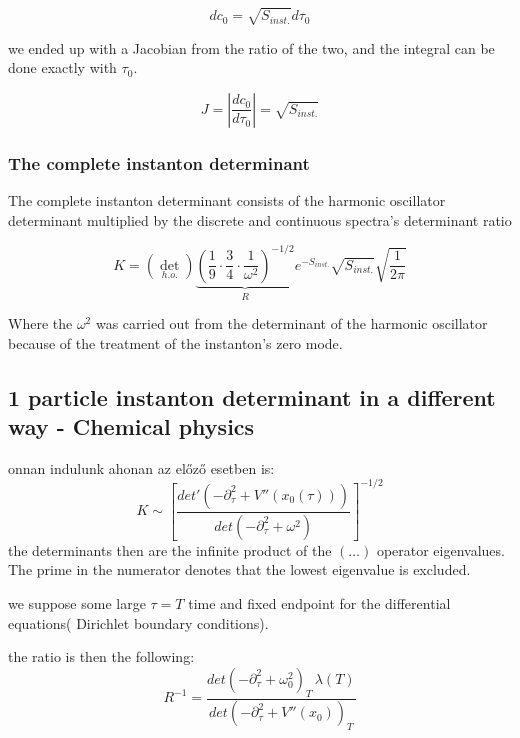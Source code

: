 \documentclass[12pt,a4paper]{article}
\numberwithin{equation}{section}
\begin{document}
\begin{equation}
dc_0 = \sqrt{S_{inst.}} d\tau_0
\end{equation}

we ended up with a Jacobian from the ratio of the two, and the integral can be done exactly with $\tau_0$.

\begin{equation}
J = \left| \frac{dc_0}{d\tau_0}  \right| = \sqrt{S_{inst.}}
\end{equation}

\subsubsection{The complete instanton determinant}

The complete instanton determinant consists of the harmonic oscillator determinant multiplied by the discrete and continuous spectra's determinant ratio

\begin{equation}
K = \left(\det_{h.o.}\right) \underbrace{\left( \frac{1}{9}\cdot \frac{3}{4}\cdot \frac{1}{\omega^2}  \right)^{-1/2}}_{R} e^{-S_{inst.}} \sqrt{S_{inst.}} \sqrt{\frac{1}{2\pi}}
\end{equation}

Where the $\omega^2$ was carried out from the determinant of the harmonic oscillator because of the treatment of the instanton's zero mode.

\subsection{1 particle instanton determinant in a different way - Chemical physics}

onnan indulunk ahonan az előző esetben is:
\begin{equation}
K \sim \left[ \frac{det' \left( -\partial_\tau^2 + V'' (x_0(\tau))  \right)}{det \left( -\partial_\tau^2 + \omega^2  \right)}  \right]^{-1/2}
\end{equation}
the determinants then are the infinite product of the $(\dots )$ operator eigenvalues. The prime in the numerator denotes that the lowest eigenvalue is excluded. 

we suppose some large $\tau = T$ time and fixed endpoint for the differential equations( Dirichlet boundary conditions).

the ratio is then the following:
\begin{equation}
R^{-1} = \frac{det (-\partial_\tau^2 + \omega_0^2)_T \, \lambda(T) }{det (-\partial_\tau^2 + V'' (x_0))_T }
\end{equation}
\end{document}
